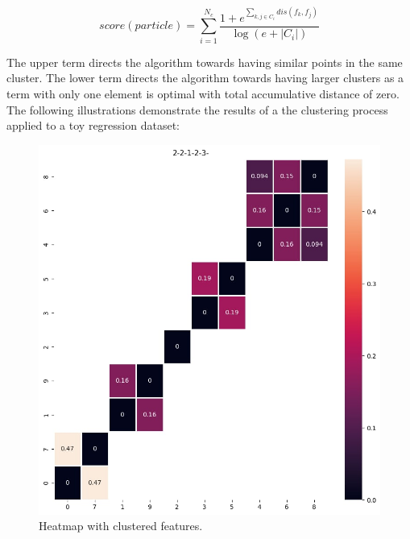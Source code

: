 \documentclass[conference]{IEEEtran}
\begin{document}
\begin{equation}
	score(particle)=\sum_{i=1}^{N_c}\dfrac{1+e^{\sum_{k, j\in C_i}^{}dis(f_k, f_j)}}{\log(e+|C_i|)}
\end{equation}

The upper term directs the algorithm towards having similar points in the same cluster. The lower term directs the algorithm towards having larger clusters as a term with only one element is optimal with total accumulative distance of zero. The following illustrations demonstrate the results of a the clustering process applied to a toy regression dataset\cite{sklearnRegression}: 

\begin{figure}[hbt!]
	\centerline{\includegraphics[scale=0.35]{picture1.jpg}}
	\caption{Heatmap with clustered features.}
	\label{fig1}
\end{figure}
\end{document}
